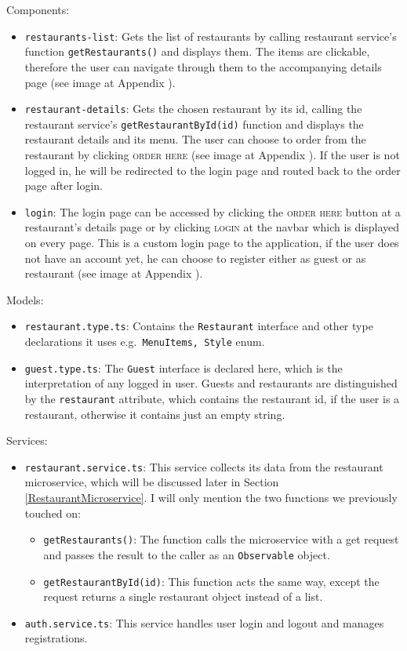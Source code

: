 Components:
\begin{itemize}
	\item \verb+restaurants-list+: Gets the list of restaurants by calling restaurant service's function \verb+getRestaurants()+ and displays them. The items are clickable, therefore the user can navigate through them to the accompanying details page (see image at Appendix ).
	
	\item \verb+restaurant-details+: Gets the chosen restaurant by its id, calling the restaurant service's \verb+getRestaurantById(id)+ function and displays the restaurant details and its menu. The user can choose to order from the restaurant by clicking \textsc{order here} (see image at Appendix ). If the user is not logged in, he will be redirected to the login page and routed back to the order page after login.
	
	\item \verb+login+: The login page can be accessed by clicking the \textsc{order here} button at a restaurant's details page or by clicking \textsc{login} at the navbar which is displayed on every page. This is a custom login page to the application, if the user does not have an account yet, he can choose to register either as guest or as restaurant (see image at Appendix ).
\end{itemize}
Models:
\begin{itemize}
	\item \verb+restaurant.type.ts+: Contains the \verb+Restaurant+ interface and other type declarations it uses e.g.\ \verb+MenuItems, Style+ enum.
	\item \verb+guest.type.ts+: The \verb+Guest+ interface is declared here, which is the interpretation of any logged in user. Guests and restaurants are distinguished by the \verb+restaurant+ attribute, which contains the restaurant id, if the user is a restaurant, otherwise it contains just an empty string.
\end{itemize}
Services:
\begin{itemize}
	\item \verb+restaurant.service.ts+: This service collects its data from the restaurant microservice, which will be discussed later in Section \ref{RestaurantMicroservice}. I will only mention the two functions we previously touched on:
	\begin{itemize}
		\item\verb+getRestaurants()+: The function calls the microservice with a get request and passes the result to the caller as an \verb+Observable+ object.
		\item\verb+getRestaurantById(id)+: This function acts the same way, except the request returns a single restaurant object instead of a list.
	\end{itemize}	
	\item \verb+auth.service.ts+: This service handles user login and logout and manages registrations. 
\end{itemize}

